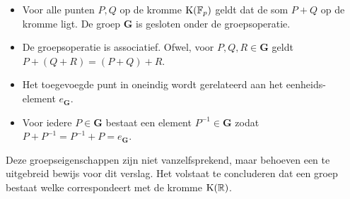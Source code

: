 \documentclass{article}
\begin{document}
\begin{itemize}
\item Voor alle punten $P, Q$ op de kromme $\textup{K}(\mathbb{F}_{p})$ geldt dat de som $P+Q$ op de kromme ligt. De groep $\mathbf{G}$ is gesloten onder de groepsoperatie. \\
\item De groepsoperatie is associatief. Ofwel, voor $P, Q, R \in \mathbf{G}$ geldt \\ $P+(Q+R) = (P+Q)+R$. \\
\item Het toegevoegde punt in oneindig wordt gerelateerd aan het eenheids- \\ element $e_{\mathbf{G}}$. \\
\item Voor iedere $P \in \mathbf{G}$ bestaat een element $P^{-1} \in \mathbf{G}$ zodat \\ $P+P^{-1} = P^{-1}+P = e_{\mathbf{G}}$. \\
\end{itemize}

Deze groepseigenschappen zijn niet vanzelfsprekend, maar behoeven een te uitgebreid bewijs voor dit verslag. Het volstaat te concluderen dat een groep bestaat welke correspondeert met de kromme $\textup{K}(\mathbb{R})$.
\end{document}
